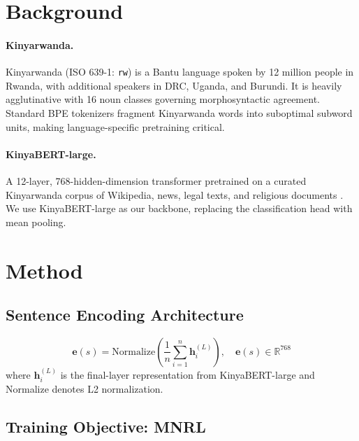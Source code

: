 \documentclass[letterpaper]{article} %
\begin{document}
\section{Background}

\paragraph{Kinyarwanda.}
Kinyarwanda (ISO 639-1: \texttt{rw}) is a Bantu language spoken by 12 million
people in Rwanda, with additional speakers in DRC, Uganda, and Burundi.
It is heavily agglutinative with 16 noun classes governing morphosyntactic
agreement. Standard BPE tokenizers fragment Kinyarwanda words into suboptimal
subword units, making language-specific pretraining critical.

\paragraph{KinyaBERT-large.}
A 12-layer, 768-hidden-dimension transformer pretrained on a curated Kinyarwanda
corpus of Wikipedia, news, legal texts, and religious documents
\cite{nzeyimana-niyongabo-habimana-2022-kinyabert}. We use KinyaBERT-large
as our backbone, replacing the classification head with mean pooling.

\section{Method}

\subsection{Sentence Encoding Architecture}

\begin{equation}
  \mathbf{e}(s) = \mathrm{Normalize}\!\left(
    \frac{1}{n}\sum_{i=1}^{n} \mathbf{h}_i^{(L)}
  \right), \quad \mathbf{e}(s) \in \mathbb{R}^{768}
\end{equation}
where $\mathbf{h}_i^{(L)}$ is the final-layer representation from
KinyaBERT-large and Normalize denotes L2 normalization.

\subsection{Training Objective: MNRL}
\end{document}
